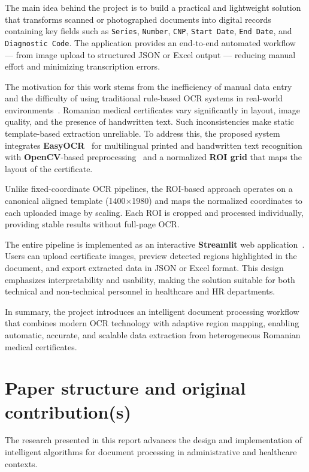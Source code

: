 \documentclass[runningheads,a4paper,11pt]{report}
\begin{document}
The main idea behind the project is to build a practical and lightweight solution that transforms scanned or photographed documents into digital records containing key fields such as \texttt{Series}, \texttt{Number}, \texttt{CNP},  \texttt{Start Date}, \texttt{End Date}, and \texttt{Diagnostic Code}.  
The application provides an end-to-end automated workflow --- from image upload to structured JSON or Excel output --- reducing manual effort and minimizing transcription errors.

The motivation for this work stems from the inefficiency of manual data entry and the difficulty of using traditional rule-based OCR systems in real-world environments~\cite{Smith2007}.  
Romanian medical certificates vary significantly in layout, image quality, and the presence of handwritten text.  
Such inconsistencies make static template-based extraction unreliable.  
To address this, the proposed system integrates \textbf{EasyOCR}~\cite{JaidedAI2020} for multilingual printed and handwritten text recognition with \textbf{OpenCV}-based preprocessing~\cite{Bradski2000} and a normalized \textbf{ROI grid} that maps the layout of the certificate.

Unlike fixed-coordinate OCR pipelines, the ROI-based approach operates on a canonical aligned template (1400$\times$1980) and maps the normalized coordinates to each uploaded image by scaling.
Each ROI is cropped and processed individually, providing stable results without full-page OCR.  

The entire pipeline is implemented as an interactive \textbf{Streamlit} web application~\cite{Streamlit2020}.  
Users can upload certificate images, preview detected regions highlighted in the document, and export extracted data in JSON or Excel format.  
This design emphasizes interpretability and usability, making the solution suitable for both technical and non-technical personnel in healthcare and HR departments.

In summary, the project introduces an intelligent document processing workflow that combines modern OCR technology with adaptive region mapping, enabling automatic, accurate, and scalable data extraction from heterogeneous Romanian medical certificates.

\section{Paper structure and original contribution(s)}
\label{section:structure}

The research presented in this report advances the design and implementation of intelligent algorithms for document processing in administrative and healthcare contexts.  
\end{document}
